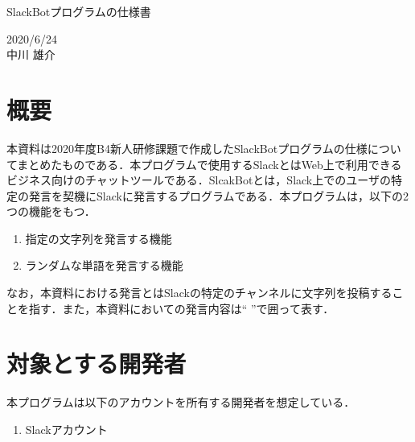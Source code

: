 \documentclass[12pt]{jsarticle}
\begin{document}
\begin{center}
{\LARGE SlackBotプログラムの仕様書}
\end{center}

\begin{flushright}
  2020/6/24\\
  中川 雄介
\end{flushright}
\section{概要}
\label{sec:introduction}
本資料は2020年度B4新人研修課題で作成したSlackBotプログラムの仕様についてまとめたものである．本プログラムで使用するSlackとはWeb上で利用できるビジネス向けのチャットツールである．SlcakBotとは，Slack上でのユーザの特定の発言を契機にSlackに発言するプログラムである．本プログラムは，以下の2つの機能をもつ．
\begin{enumerate}
\item 指定の文字列を発言する機能
\item ランダムな単語を発言する機能
\end{enumerate}
なお，本資料における発言とはSlackの特定のチャンネルに文字列を投稿することを指す．また，本資料においての発言内容は`` ''で囲って表す．

\section{対象とする開発者}\label{sec:user}
本プログラムは以下のアカウントを所有する開発者を想定している．
\begin{enumerate}
\item Slackアカウント
\end{enumerate}
\end{document}
